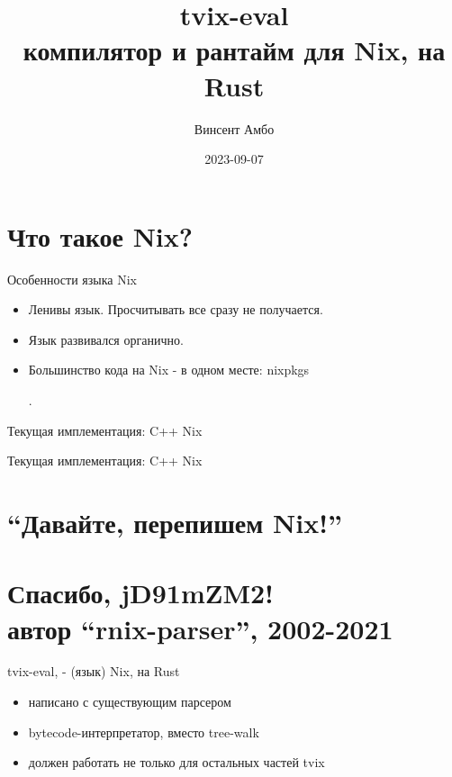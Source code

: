 \documentclass[12pt]{beamer}
\title{tvix-eval \\ компилятор и рантайм для Nix, на Rust}
\date{2023-09-07}
\author{Винсент Амбо}
\institute{TVL}
\newenvironment{code}{\ttfamily}{\par}
\begin{document}
  \begin{frame}
    \begin{center}
      \titlepage
    \end{center}
  \end{frame}

  \section{Что такое Nix?}

  \begin{frame}{Особенности языка Nix}
    \begin{itemize}
    \item Ленивы язык. Просчитывать все сразу не получается.
    \item Язык развивался органично.
    \item Большинство кода на Nix - в одном месте: \begin{code}nixpkgs\end{code}.
    \end{itemize}
  \end{frame}

  \begin{frame}{Текущая имплементация: C++ Nix}
    
  \end{frame}

  \begin{frame}{Текущая имплементация: C++ Nix}
    
  \end{frame}

  \section{``Давайте, перепишем Nix!''}

  \section*{Спасибо, jD91mZM2!\\\normalsize{автор ``rnix-parser'', 2002-2021}}

  \begin{frame}{tvix-eval, - (язык) Nix, на Rust}
    \begin{itemize}
    \item написано с существующим парсером
    \item bytecode-интерпретатор, вместо tree-walk
    \item должен работать не только для остальных частей tvix
    \end{itemize}
  \end{frame}
\end{document}
